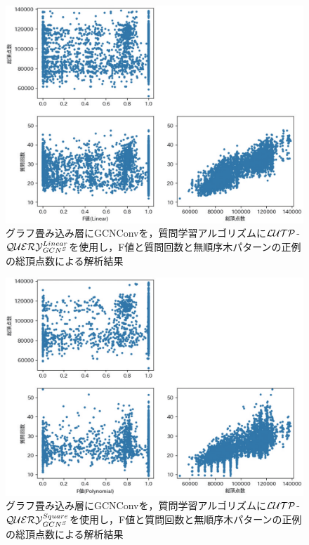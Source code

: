 \begin{figure}[tb]
  \centering
  \includegraphics[scale=0.66]{fig/fig-GCNConv_ln_ql_f1_nodes.eps}
  \caption{グラフ畳み込み層にGCNConvを，質問学習アルゴリズムに${\cal LUTP}$-${\cal QUERY}_{GCN^S}^{Linear}$を使用し，F値と質問回数と無順序木パターンの正例の総頂点数による解析結果}\label{fig:GCNConv_ln_ql_f1_nodes}
\end{figure}

\begin{figure}[tb]
  \centering
  \includegraphics[scale=0.66]{fig/fig-GCNConv_sqr_ql_f1_nodes.eps}
  \caption{グラフ畳み込み層にGCNConvを，質問学習アルゴリズムに${\cal LUTP}$-${\cal QUERY}_{GCN^S}^{Square}$を使用し，F値と質問回数と無順序木パターンの正例の総頂点数による解析結果}\label{fig:GCNConv_sqr_ql_f1_nodes}
\end{figure}


